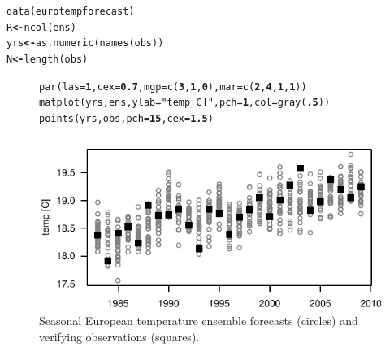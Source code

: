 \documentclass[10pt]{article}\usepackage[]{graphicx}\usepackage[]{color}
\makeatletter
\def\maxwidth{ %
  \ifdim\Gin@nat@width>\linewidth
    \linewidth
  \else
    \Gin@nat@width
  \fi
}
\newcommand{\hlnum}[1]{\textcolor[rgb]{0.502,0,0.502}{\textbf{#1}}}%
\newcommand{\hlstr}[1]{\textcolor[rgb]{0.651,0.522,0}{#1}}%
\newcommand{\hlstd}[1]{\textcolor[rgb]{0,0,0}{#1}}%
\newcommand{\hlkwb}[1]{\textcolor[rgb]{0.502,0.502,0.753}{\textbf{#1}}}%
\newcommand{\hlkwc}[1]{\textcolor[rgb]{0,0.502,0.753}{#1}}%
\newcommand{\hlkwd}[1]{\textcolor[rgb]{0,0.267,0.4}{#1}}%
\newenvironment{kframe}{%
 \def\at@end@of@kframe{}%
 \ifinner\ifhmode%
  \def\at@end@of@kframe{\end{minipage}}%
  \begin{minipage}{\columnwidth}%
 \fi\fi%
 \def\FrameCommand##1{\hskip\@totalleftmargin \hskip-\fboxsep
 \colorbox{shadecolor}{##1}\hskip-\fboxsep
     \hskip-\linewidth \hskip-\@totalleftmargin \hskip\columnwidth}%
 \MakeFramed {\advance\hsize-\width
   \@totalleftmargin\z@ \linewidth\hsize
   \@setminipage}}%
 {\par\unskip\endMakeFramed%
 \at@end@of@kframe}
\newenvironment{knitrout}{}{} %
\makeatother
\begin{document}
\begin{knitrout}
\color{fgcolor}\begin{kframe}
\begin{alltt}
\hlkwd{data}\hlstd{(eurotempforecast)}
\hlstd{R}   \hlkwb{<-} \hlkwd{ncol}\hlstd{(ens)}
\hlstd{yrs} \hlkwb{<-} \hlkwd{as.numeric}\hlstd{(}\hlkwd{names}\hlstd{(obs))}
\hlstd{N}   \hlkwb{<-} \hlkwd{length}\hlstd{(obs)}
\end{alltt}
\end{kframe}
\end{knitrout}



\begin{figure}
\begin{center}
%
\begin{knitrout}
\color{fgcolor}\begin{kframe}
\begin{alltt}
\hlkwd{par}\hlstd{(}\hlkwc{las}\hlstd{=}\hlnum{1}\hlstd{,} \hlkwc{cex}\hlstd{=}\hlnum{0.7}\hlstd{,} \hlkwc{mgp}\hlstd{=}\hlkwd{c}\hlstd{(}\hlnum{3}\hlstd{,} \hlnum{1}\hlstd{,} \hlnum{0}\hlstd{),} \hlkwc{mar}\hlstd{=}\hlkwd{c}\hlstd{(}\hlnum{2}\hlstd{,}\hlnum{4}\hlstd{,}\hlnum{1}\hlstd{,}\hlnum{1}\hlstd{))}
\hlkwd{matplot}\hlstd{(yrs, ens,} \hlkwc{ylab}\hlstd{=}\hlstr{"temp [C]"}\hlstd{,} \hlkwc{pch}\hlstd{=}\hlnum{1}\hlstd{,} \hlkwc{col}\hlstd{=}\hlkwd{gray}\hlstd{(}\hlnum{.5}\hlstd{))}
\hlkwd{points}\hlstd{(yrs, obs,} \hlkwc{pch}\hlstd{=}\hlnum{15}\hlstd{,} \hlkwc{cex}\hlstd{=}\hlnum{1.5}\hlstd{)}
\end{alltt}
\end{kframe}
\includegraphics[width=\maxwidth]{figure/gfs-plot-1} 

\end{knitrout}
%
\end{center}
\caption{Seasonal European temperature ensemble forecasts (circles) and verifying observations (squares).}
\label{gfs-plot}
\end{figure}
\end{document}

